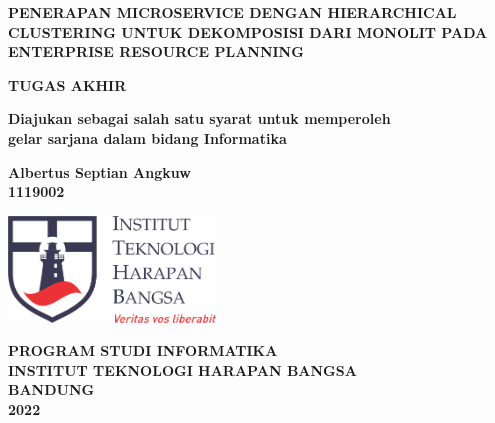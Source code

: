 \begin{titlepage}
	\begin{center}
		\vspace*{0cm}
		
		{\large \bfseries PENERAPAN MICROSERVICE DENGAN HIERARCHICAL CLUSTERING UNTUK DEKOMPOSISI DARI MONOLIT PADA ENTERPRISE RESOURCE PLANNING }
			
		\vspace{3cm}
		
	 	{\large \bfseries TUGAS AKHIR}
	 	
	 	\vspace{1cm}
	 	{ \bfseries Diajukan sebagai salah satu syarat untuk memperoleh \\
	 				gelar sarjana dalam bidang Informatika }
 		

		\vspace{1cm}
		
		{ \bfseries Albertus Septian Angkuw \\ 1119002 }
		
	
		\vspace*{\fill} 
		
		\includegraphics[width=5.5cm]{img/ithb.png}
	
		\vspace{2.5cm}

		{\large \bfseries PROGRAM STUDI INFORMATIKA \\
		INSTITUT TEKNOLOGI HARAPAN BANGSA \\
		BANDUNG\\
		2022}
		
		\vspace{1cm}
	\end{center}
\end{titlepage}